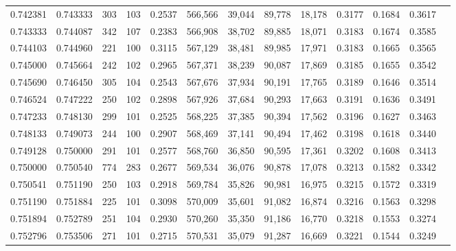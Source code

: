 \begin{tabular}{rrrrrrrrrrrrr}
0.742381 & 0.743333 &    303 &   103 &                                     0.2537 & 566,566 &  39,044 &  89,778 &  18,178 & 0.3177 & 0.1684 & 0.3617 \\
0.743333 & 0.744087 &    342 &   107 &                                     0.2383 & 566,908 &  38,702 &  89,885 &  18,071 & 0.3183 & 0.1674 & 0.3585 \\
0.744103 & 0.744960 &    221 &   100 &                                     0.3115 & 567,129 &  38,481 &  89,985 &  17,971 & 0.3183 & 0.1665 & 0.3565 \\
0.745000 & 0.745664 &    242 &   102 &                                     0.2965 & 567,371 &  38,239 &  90,087 &  17,869 & 0.3185 & 0.1655 & 0.3542 \\
0.745690 & 0.746450 &    305 &   104 &                                     0.2543 & 567,676 &  37,934 &  90,191 &  17,765 & 0.3189 & 0.1646 & 0.3514 \\
0.746524 & 0.747222 &    250 &   102 &                                     0.2898 & 567,926 &  37,684 &  90,293 &  17,663 & 0.3191 & 0.1636 & 0.3491 \\
0.747233 & 0.748130 &    299 &   101 &                                     0.2525 & 568,225 &  37,385 &  90,394 &  17,562 & 0.3196 & 0.1627 & 0.3463 \\
0.748133 & 0.749073 &    244 &   100 &                                     0.2907 & 568,469 &  37,141 &  90,494 &  17,462 & 0.3198 & 0.1618 & 0.3440 \\
0.749128 & 0.750000 &    291 &   101 &                                     0.2577 & 568,760 &  36,850 &  90,595 &  17,361 & 0.3202 & 0.1608 & 0.3413 \\
0.750000 & 0.750540 &    774 &   283 &                                     0.2677 & 569,534 &  36,076 &  90,878 &  17,078 & 0.3213 & 0.1582 & 0.3342 \\
0.750541 & 0.751190 &    250 &   103 &                                     0.2918 & 569,784 &  35,826 &  90,981 &  16,975 & 0.3215 & 0.1572 & 0.3319 \\
0.751190 & 0.751884 &    225 &   101 &                                     0.3098 & 570,009 &  35,601 &  91,082 &  16,874 & 0.3216 & 0.1563 & 0.3298 \\
0.751894 & 0.752789 &    251 &   104 &                                     0.2930 & 570,260 &  35,350 &  91,186 &  16,770 & 0.3218 & 0.1553 & 0.3274 \\
0.752796 & 0.753506 &    271 &   101 &                                     0.2715 & 570,531 &  35,079 &  91,287 &  16,669 & 0.3221 & 0.1544 & 0.3249 \\

\end{tabular}
